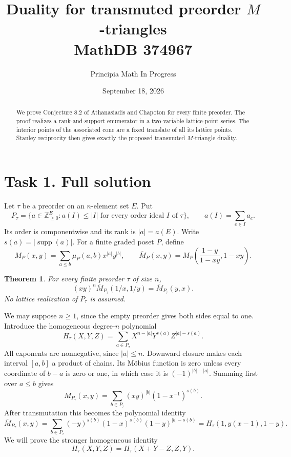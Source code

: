 \documentclass[11pt]{article}
\title{Duality for transmuted preorder $M$-triangles\\\large MathDB 374967}
\author{Principia Math In Progress}
\date{September 18, 2026}
\newtheorem{theorem}{Theorem}
\newcommand{\Z}{\mathbb Z}
\newcommand{\supp}{\operatorname{supp}}
\newcommand{\M}{\overline M}
\begin{document}
\maketitle
\begin{abstract}
We prove Conjecture 8.2 of Athanasiadis and Chapoton for every finite
preorder. The proof realizes a rank-and-support enumerator in a
two-variable lattice-point series. The interior points of the associated
cone are a fixed translate of all its lattice points. Stanley reciprocity
then gives exactly the proposed transmuted $M$-triangle duality.
\end{abstract}

\section*{Task 1. Full solution}
Let $\tau$ be a preorder on an $n$-element set $E$. Put
\[
 P_\tau=\{a\in\Z_{\ge0}^E:a(I)\le |I|
                       \text{ for every order ideal $I$ of $\tau$}\},
 \qquad a(I)=\sum_{e\in I}a_e.
\]
Its order is componentwise and its rank is $|a|=a(E)$. Write
$s(a)=|\supp(a)|$. For a finite graded poset $P$, define
\[
 M_P(x,y)=\sum_{a\le b}\mu_P(a,b)x^{|a|}y^{|b|},\qquad
 \M_P(x,y)=M_P\left(\frac{1-y}{1-xy},1-xy\right).
\]
\begin{theorem}\label{thm:main}
For every finite preorder $\tau$ of size $n$,
\[
 \boxed{(xy)^n\M_{P_\tau}(1/x,1/y)=\M_{P_\tau}(y,x).}
\]
No lattice realization of $P_\tau$ is assumed.
\end{theorem}

We may suppose $n\ge1$, since the empty preorder gives both sides
equal to one. Introduce the homogeneous degree-$n$ polynomial
\begin{equation}\label{eq:H}
 H_\tau(X,Y,Z)=\sum_{a\in P_\tau}
                    X^{n-|a|}Y^{s(a)}Z^{|a|-s(a)}.
\end{equation}
All exponents are nonnegative, since $|a|\le n$.
Downward closure makes each interval $[a,b]$ a product of chains.
Its M\"obius function is zero unless every coordinate of $b-a$ is
zero or one, in which case it is $(-1)^{|b|-|a|}$. Summing first
over $a\le b$ gives
\[
 M_{P_\tau}(x,y)=\sum_{b\in P_\tau}(xy)^{|b|}(1-x^{-1})^{s(b)}.
\]
After transmutation this becomes the polynomial identity
\begin{equation}\label{eq:M}
 \M_{P_\tau}(x,y)
 =\sum_{b\in P_\tau}(-y)^{s(b)}(1-x)^{s(b)}(1-y)^{|b|-s(b)}
 =H_\tau(1,y(x-1),1-y).
\end{equation}
We will prove the stronger homogeneous identity
\begin{equation}\label{eq:Hinvolution}
 H_\tau(X,Y,Z)=H_\tau(X+Y-Z,Z,Y).
\end{equation}
\end{document}
